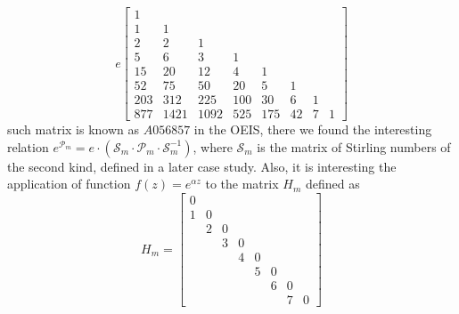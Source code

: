 \begin{displaymath}
e \left[\begin{matrix}1 &   &   &   &   &   &   &  \\1 & 1 &   &   &   &   &   &  \\2 & 2 & 1 &   &   &   &   &  \\5 & 6 & 3 & 1 &   &   &   &  \\15 & 20 & 12 & 4 & 1 &   &   &  \\52 & 75 & 50 & 20 & 5 & 1 &   &  \\203 & 312 & 225 & 100 & 30 & 6 & 1 &  \\877 & 1421 & 1092 & 525 & 175 & 42 & 7 & 1\end{matrix}\right]
\end{displaymath}
such matrix is known as $A056857$ in the OEIS, there we found
the interesting relation $e^{\mathcal{P}_{m}}=e\cdot\left(\mathcal{S}_{m}\cdot \mathcal{P}_{m}\cdot \mathcal{S}_{m}^{-1}\right)$,
where $\mathcal{S}_{m}$ is the matrix of Stirling numbers of the second kind, defined in a later case study.
Also, it is interesting the application of function $f(z)=e^{\alpha z}$ to the matrix $H_{m}$ defined as
\begin{displaymath}
H_{m} = \left[\begin{matrix} 0 &   &   &   &   &   &   &  \\1 & 0   &   &   &   &   &   &  \\  & 2 &  0  &   &   &   &   &  \\  &   & 3 &  0  &   &   &   &  \\  &   &   & 4 &  0  &   &   &  \\  &   &   &   & 5 &  0  &   &  \\  &   &   &   &   & 6 &  0  &  \\  &   &   &   &   &   & 7 &  0 \end{matrix}\right]
\end{displaymath}
